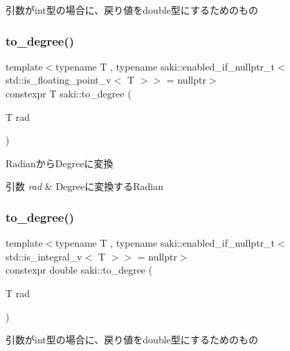 引数がint型の場合に、戻り値をdouble型にするためのもの 

\mbox{\label{namespacesaki_af9f6d8f2c0663a0452c7edd17bf5daf0}} 
\subsubsection{\texorpdfstring{to\+\_\+degree()}{to\_degree()}\hspace{0.1cm}{\footnotesize\ttfamily [1/2]}}
{\footnotesize\ttfamily template$<$typename T , typename saki\+::enabled\+\_\+if\+\_\+nullptr\+\_\+t$<$ std\+::is\+\_\+floating\+\_\+point\+\_\+v$<$ T $>$$>$  = nullptr$>$ \\
constexpr T saki\+::to\+\_\+degree (\begin{DoxyParamCaption}\item[{T}]{rad }\end{DoxyParamCaption})}



Radianから\+Degreeに変換 


\begin{DoxyParams}{引数}
{\em rad} & Degreeに変換する\+Radian \\
\hline
\end{DoxyParams}
\mbox{\label{namespacesaki_aa7cb33956f8d7354b485aee878d7805d}} 
\subsubsection{\texorpdfstring{to\+\_\+degree()}{to\_degree()}\hspace{0.1cm}{\footnotesize\ttfamily [2/2]}}
{\footnotesize\ttfamily template$<$typename T , typename saki\+::enabled\+\_\+if\+\_\+nullptr\+\_\+t$<$ std\+::is\+\_\+integral\+\_\+v$<$ T $>$$>$  = nullptr$>$ \\
constexpr double saki\+::to\+\_\+degree (\begin{DoxyParamCaption}\item[{T}]{rad }\end{DoxyParamCaption})}



引数がint型の場合に、戻り値をdouble型にするためのもの 

\mbox{\label{namespacesaki_a27595b1e53058ce792db7f8d29e2e9af}} 
